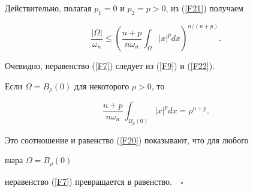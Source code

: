 Действительно, полагая $p_1=0$ и $p_2=p>0$, из (\ref{F21}) получаем


\begin{equation} \label{F22}


\frac{|\Omega|}{\omega_n}\leq


\left( {\frac{n+p}{n\omega_n}\int_\Omega |x|^pdx } \right)^{n/(n+p)}.


\end{equation}


Очевидно, неравенство (\ref{F7}) следует из  (\ref{F9}) и (\ref{F22}).





Если $\Omega=B_\rho (0)$ для некоторого $\rho>0$, то


$$


\frac{n+p}{n\omega_n}\int_{B_\rho (0)} |x|^pdx=\rho^{n+p}.


$$


Это соотношение и равенство (\ref{F20}) показывают, что для любого 


шара $\Omega =B_\rho (0)$


неравенство (\ref{F7}) превращается в равенство.$\quad\square$





